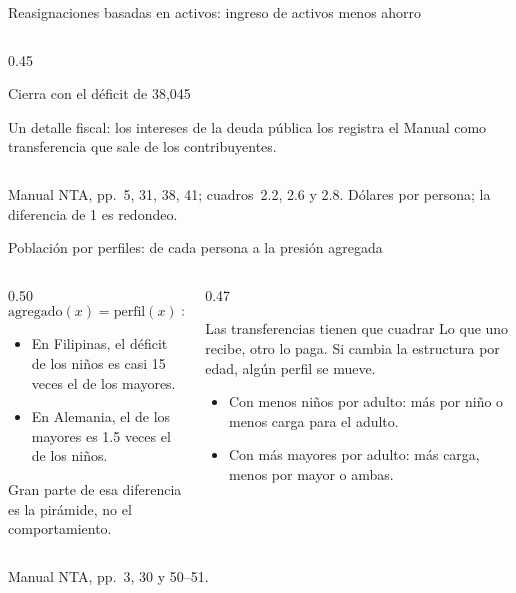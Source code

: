 \documentclass[aspectratio=169,11pt]{beamer}
\newcommand{\fuente}[1]{\par\vfill{\small\color{cGris}#1\par}}
\begin{document}
\begin{frame}{Reasignaciones basadas en activos: ingreso de activos menos ahorro}
\begin{columns}[T]
\begin{column}{0.45\textwidth}
\begin{block}{Cierra con el déficit de 38,045}
      \end{block}
      \pause
      Un detalle fiscal: los intereses de la deuda pública los registra el Manual como transferencia que sale de los contribuyentes.
    \end{column}
  \end{columns}
  \fuente{Manual NTA, pp.~5, 31, 38, 41; cuadros~2.2, 2.6 y 2.8. Dólares por persona; la diferencia de 1 es redondeo.}
\end{frame}

\begin{frame}{Población por perfiles: de cada persona a la presión agregada}
  \begin{columns}[T]
    \begin{column}{0.50\textwidth}
      \[
        \text{agregado}(x)=\text{perfil}(x)\times\text{población}(x)
      \]
      \begin{itemize}
        \item En Filipinas, el déficit de los niños es casi 15 veces el de los mayores.
        \item En Alemania, el de los mayores es 1.5 veces el de los niños.
      \end{itemize}
      \pause
      Gran parte de esa diferencia es la pirámide, no el comportamiento.
    \end{column}
    \begin{column}{0.47\textwidth}
      \pause
      \begin{block}{Las transferencias tienen que cuadrar}
        Lo que uno recibe, otro lo paga. Si cambia la estructura por edad, algún perfil se mueve.
      \end{block}
      \begin{itemize}
        \item Con menos niños por adulto: más por niño o menos carga para el adulto.
        \item Con más mayores por adulto: más carga, menos por mayor o ambas.
      \end{itemize}
    \end{column}
  \end{columns}
  \fuente{Manual NTA, pp.~3, 30 y 50--51.}
\end{frame}
\end{document}
